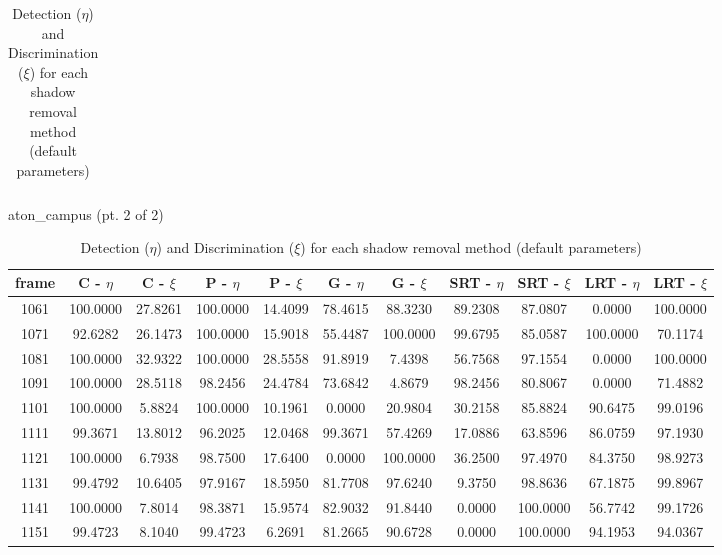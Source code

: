\begin{appendices}
\begin{table}
\begin{tabular}{ |c|c|c|c|c|c|c|c|c|c|c| }
\hline
\end{tabular}
\caption*{Detection ($\eta$) and Discrimination ($\xi$) for each shadow removal method (default parameters)}
\end{table}

\begin{table}
\centering
\caption{aton\_campus (pt. 2 of 2)}
\begin{tabular}{ |c|c|c|c|c|c|c|c|c|c|c| }
	\hline
\textbf{frame} &  \textbf{C - $\eta$} &  \textbf{C - $\xi$} &  \textbf{P - $\eta$} &  \textbf{P - $\xi$} &  \textbf{G - $\eta$} &  \textbf{G - $\xi$} &  \textbf{SRT - $\eta$} &  \textbf{SRT - $\xi$} &  \textbf{LRT - $\eta$} &  \textbf{LRT - $\xi$} \\
\hline
\hline
1061 &  100.0000 &  27.8261 &   100.0000 &  14.4099 &   78.4615 &  88.3230 &   89.2308 &  87.0807 &   0.0000 &  100.0000    \\
\hline
1071 &  92.6282 &  26.1473 &   100.0000 &  15.9018 &   55.4487 &  100.0000 &   99.6795 &  85.0587 &   100.0000 &  70.1174    \\
\hline
1081 &  100.0000 &  32.9322 &   100.0000 &  28.5558 &   91.8919 &  7.4398 &   56.7568 &  97.1554 &   0.0000 &  100.0000   \\
\hline
1091 &  100.0000 &  28.5118 &   98.2456 &  24.4784 &   73.6842 &  4.8679 &   98.2456 &  80.8067 &   0.0000 &  71.4882    \\
\hline
1101 &  100.0000 &  5.8824 &   100.0000 &  10.1961 &   0.0000 &  20.9804 &   30.2158 &  85.8824 &   90.6475 &  99.0196    \\
\hline
1111 &  99.3671 &  13.8012 &   96.2025 &  12.0468 &   99.3671 &  57.4269 &   17.0886 &  63.8596 &   86.0759 &  97.1930    \\
\hline
1121 &  100.0000 &  6.7938 &   98.7500 &  17.6400 &   0.0000 &  100.0000 &   36.2500 &  97.4970 &   84.3750 &  98.9273    \\
\hline
1131 &  99.4792 &  10.6405 &   97.9167 &  18.5950 &   81.7708 &  97.6240 &   9.3750 &  98.8636 &   67.1875 &  99.8967    \\
\hline
1141 &  100.0000 &  7.8014 &   98.3871 &  15.9574 &   82.9032 &  91.8440 &   0.0000 &  100.0000 &   56.7742 &  99.1726   \\
\hline
1151 &  99.4723 &  8.1040 &   99.4723 &  6.2691 &   81.2665 &  90.6728 &   0.0000 &  100.0000 &   94.1953 &  94.0367   \\

\hline
\end{tabular}
\caption*{Detection ($\eta$) and Discrimination ($\xi$) for each shadow removal method (default parameters)}
\end{table}


\end{appendices}
